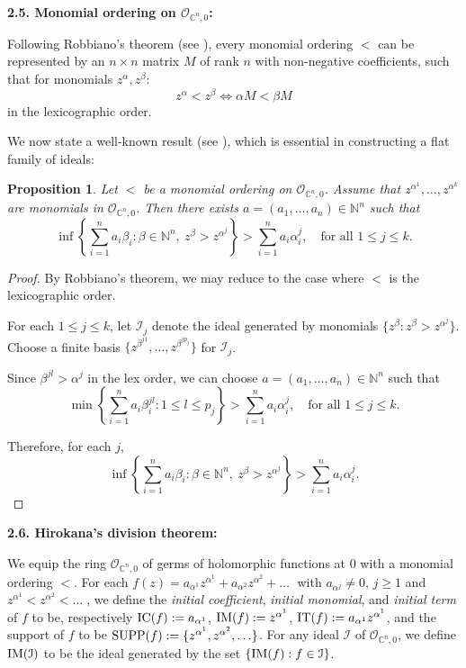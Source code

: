 \documentclass[a4paper,oneside,reqno,11pt]{article}
\newtheorem{proposition}[theorem]{Proposition}
\def\ul#1{{\smash{\rm#1}}}
\def\SUPP{\mathop{\ul{SUPP}}}
\def\IM{\mathop{\ul{IM}}}
\def\IC{\mathop{\ul{IC}}}
\def\IT{\mathop{\ul{IT}}}
\begin{document}
{\bf 2.5. Monomial ordering on $\mathcal O_{ \mathbb C^n, 0}$:}

Following Robbiano's theorem (see \cite{Ro85}), every monomial ordering $<$ can be represented by an $n \times n$ matrix $M$ of rank $n$ with non-negative coefficients, such that for monomials $z^{\alpha}, z^{\beta}$:
$$z^{\alpha} < z^{\beta} \iff \alpha M < \beta M$$
in the lexicographic order.

We now state a well-known result (see \cite{Ei95}), which is essential in constructing a flat family of ideals:

\begin{proposition}\label{flat_family}
	Let $<$ be a monomial ordering on $\mathcal{O}_{\mathbb{C}^n, 0}$. Assume that $z^{\alpha^1}, \dots, z^{\alpha^k}$ are monomials in $\mathcal{O}_{\mathbb{C}^n, 0}$. Then there exists $a = (a_1, \dots, a_n) \in \mathbb{N}^n$ such that
	$$
	\inf\left\{ \sum_{i=1}^n a_i \beta_i : \beta \in \mathbb{N}^n,\ z^{\beta} > z^{\alpha^j} \right\}
	> \sum_{i=1}^n a_i \alpha_i^j,\quad \text{for all } 1 \leq j \leq k.
	$$
\end{proposition}

\begin{proof}
	By Robbiano's theorem, we may reduce to the case where $<$ is the lexicographic order.
	
	For each $1 \leq j \leq k$, let $\mathcal{I}_j$ denote the ideal generated by monomials $\{ z^\beta : z^\beta > z^{\alpha^j} \}$. Choose a finite basis $\{ z^{\beta^{j1}}, \dots, z^{\beta^{jp_j}} \}$ for $\mathcal{I}_j$.
	
	Since $\beta^{jl} > \alpha^j$ in the lex order, we can choose $a = (a_1, \dots, a_n) \in \mathbb{N}^n$ such that
	$$
	\min \left\{ \sum_{i=1}^n a_i \beta_i^{jl} : 1 \leq l \leq p_j \right\}
	> \sum_{i=1}^n a_i \alpha_i^j,
	\quad \text{for all } 1 \leq j \leq k.
	$$
	
	Therefore, for each $j$,
	$$
	\inf\left\{ \sum_{i=1}^n a_i \beta_i : \beta \in \mathbb{N}^n,\ z^\beta > z^{\alpha^j} \right\}
	> \sum_{i=1}^n a_i \alpha_i^j.
	$$
\end{proof}

{\bf 2.6. Hirokana's division theorem:}

We equip the ring ${\mathcal O}_{\mathbb C^n,0}$ of germs of holomorphic functions at $0$ with a monomial ordering $<$. For each $f(z)=a_{\alpha^1} z^{\alpha^1}+a_{\alpha^2} z^{\alpha^2}+\ldots\;$ with $a_{\alpha^j}\not = 0$, $j\geq 1$ and $z^{ \alpha^1 } < z^{ \alpha^2 } < \ldots\;$, we define the \emph{initial coefficient}, \emph{initial monomial}, and \emph{initial term} of $f$ to be, respectively $\IC(f): = a_{\alpha^1}$, $\IM(f): = z^{\alpha^1}$, $\IT(f): = a_{\alpha^1} z^{\alpha^1}$, and the support of $f$ to be $\SUPP(f): = \{z^{ \alpha^1 }, z^{ \alpha^2 }, \ldots\}$. For any ideal $\mathcal I$ of ${\mathcal O}_{\mathbb C^n,0}$, we define $\IM(\mathcal{I})$ to be the ideal generated by the set $\{ \IM(f) : f \in \mathcal{I} \}$. 
\end{document}
